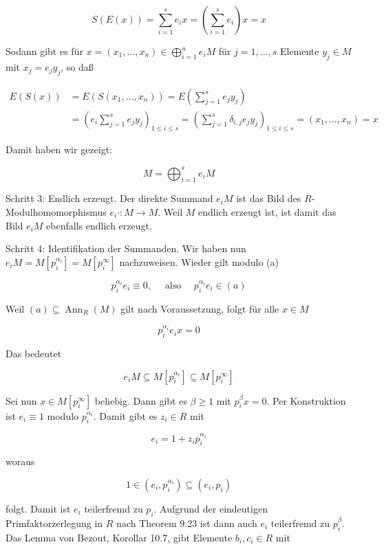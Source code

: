 \documentclass[10pt, letterpaper]{article}
\begin{document}
$$
S(E(x))=\sum_{i=1}^{s} e_{i} x=\left(\sum_{i=1}^{s} e_{i}\right) x=x
$$

Sodann gibt es für $x=\left(x_{1}, \ldots, x_{n}\right) \in \bigoplus_{i=1}^{n} e_{i} M$ für $j=1, \ldots, s$ Elemente $y_{j} \in M$ mit $x_{j}=e_{j} y_{j}$, so daß

$$
\begin{aligned}
E(S(x)) & =E\left(S\left(x_{1}, \ldots, x_{n}\right)\right)=E\left(\sum_{j=1}^{s} e_{j} y_{j}\right) \\
& =\left(e_{i} \sum_{j=1}^{s} e_{j} y_{j}\right)_{1 \leq i \leq s}=\left(\sum_{j=1}^{s} \delta_{i, j} e_{j} y_{j}\right)_{1 \leq i \leq s}=\left(x_{1}, \ldots, x_{n}\right)=x
\end{aligned}
$$

Damit haben wir gezeigt:

$$
M=\bigoplus_{i=1}^{s} e_{i} M
$$

Schritt 3: Endlich erzeugt. Der direkte Summand $e_{i} M$ ist das Bild des $R$-Modulhomomorphismus $e_{i} \cdot: M \rightarrow M$. Weil $M$ endlich erzeugt ist, ist damit das Bild $e_{i} M$ ebenfalls endlich erzeugt.

Schritt 4: Identifikation der Summanden. Wir haben nun $e_{i} M=M\left[p_{i}^{\alpha_{i}}\right]=M\left[p_{i}^{\infty}\right]$ nachzuweisen. Wieder gilt modulo (a)

$$
p_{i}^{\alpha_{i}} e_{i} \equiv 0, \quad \text { also } \quad p_{i}^{\alpha_{i}} e_{i} \in(a)
$$

Weil $(a) \subseteq \operatorname{Ann}_{R}(M)$ gilt nach Voraussetzung, folgt für alle $x \in M$

$$
p_{i}^{\alpha_{i}} e_{i} x=0
$$

Das bedeutet

$$
e_{i} M \subseteq M\left[p_{i}^{\alpha_{i}}\right] \subseteq M\left[p_{i}^{\infty}\right]
$$

Sei nun $x \in M\left[p_{i}^{\infty}\right]$ beliebig. Dann gibt es $\beta \geq 1$ mit $p_{i}^{\beta} x=0$. Per Konstruktion ist $e_{i} \equiv 1$ modulo $p_{i}^{\alpha_{i}}$. Damit gibt es $z_{i} \in R$ mit

$$
e_{i}=1+z_{i} p_{i}^{\alpha_{i}}
$$

woraus

$$
1 \in\left(e_{i}, p_{i}^{\alpha_{i}}\right) \subseteq\left(e_{i}, p_{i}\right)
$$

folgt. Damit ist $e_{i}$ teilerfremd zu $p_{i}$. Aufgrund der eindeutigen Primfaktorzerlegung in $R$ nach Theorem 9.23 ist dann auch $e_{i}$ teilerfremd zu $p_{i}^{\beta}$. Das Lemma von Bezout, Korollar 10.7, gibt Elemente $b_{i}, c_{i} \in R$ mit
\end{document}
